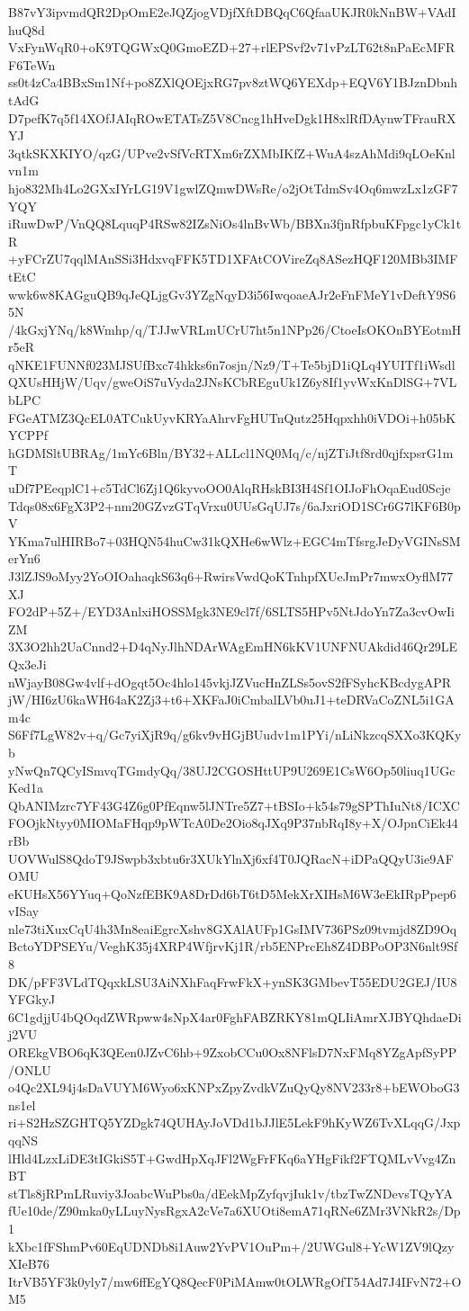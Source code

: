B87vY3ipvmdQR2DpOmE2eJQZjogVDjfXftDBQqC6QfaaUKJR0kNnBW+VAdIhuQ8d
VxFynWqR0+oK9TQGWxQ0GmoEZD+27+rlEPSvf2v71vPzLT62t8nPaEcMFRF6TeWn
ss0t4zCa4BBxSm1Nf+po8ZXlQOEjxRG7pv8ztWQ6YEXdp+EQV6Y1BJznDbnhtAdG
D7pefK7q5f14XOfJAIqROwETATsZ5V8Cncg1hHveDgk1H8xlRfDAynwTFrauRXYJ
3qtkSKXKIYO/qzG/UPve2vSfVcRTXm6rZXMbIKfZ+WuA4szAhMdi9qLOeKnlvn1m
hjo832Mh4Lo2GXxIYrLG19V1gwlZQmwDWsRe/o2jOtTdmSv4Oq6mwzLx1zGF7YQY
iRuwDwP/VnQQ8LquqP4RSw82IZsNiOs4lnBvWb/BBXn3fjnRfpbuKFpgc1yCk1tR
+yFCrZU7qqlMAnSSi3HdxvqFFK5TD1XFAtCOVireZq8ASezHQF120MBb3IMFtEtC
wwk6w8KAGguQB9qJeQLjgGv3YZgNqyD3i56IwqoaeAJr2eFnFMeY1vDeftY9S65N
/4kGxjYNq/k8Wmhp/q/TJJwVRLmUCrU7ht5n1NPp26/CtoeIsOKOnBYEotmHr5eR
qNKE1FUNNf023MJSUfBxc74hkks6n7osjn/Nz9/T+Te5bjD1iQLq4YUITf1iWsdl
QXUsHHjW/Uqv/gweOiS7uVyda2JNsKCbREguUk1Z6y8If1yvWxKnDlSG+7VLbLPC
FGeATMZ3QcEL0ATCukUyvKRYaAhrvFgHUTnQutz25Hqpxhh0iVDOi+h05bKYCPPf
hGDMSltUBRAg/1mYc6Bln/BY32+ALLcl1NQ0Mq/c/njZTiJtf8rd0qjfxpsrG1mT
uDf7PEeqplC1+c5TdCl6Zj1Q6kyvoOO0AlqRHskBI3H4Sf1OIJoFhOqaEud0Scje
Tdqs08x6FgX3P2+nm20GZvzGTqVrxu0UUsGqUJ7s/6aJxriOD1SCr6G7lKF6B0pV
YKma7ulHIRBo7+03HQN54huCw31kQXHe6wWlz+EGC4mTfsrgJeDyVGINsSMerYn6
J3lZJS9oMyy2YoOIOahaqkS63q6+RwirsVwdQoKTnhpfXUeJmPr7mwxOyflM77XJ
FO2dP+5Z+/EYD3AnlxiHOSSMgk3NE9cl7f/6SLTS5HPv5NtJdoYn7Za3cvOwIiZM
3X3O2hh2UaCnnd2+D4qNyJlhNDArWAgEmHN6kKV1UNFNUAkdid46Qr29LEQx3eJi
nWjayB08Gw4vlf+dOgqt5Oc4hlo145vkjJZVucHnZLSs5ovS2fFSyhcKBcdygAPR
jW/HI6zU6kaWH64aK2Zj3+t6+XKFaJ0iCmbalLVb0uJ1+teDRVaCoZNL5i1GAm4c
S6Ff7LgW82v+q/Gc7yiXjR9q/g6kv9vHGjBUudv1m1PYi/nLiNkzcqSXXo3KQKyb
yNwQn7QCyISmvqTGmdyQq/38UJ2CGOSHttUP9U269E1CsW6Op50liuq1UGcKed1a
QbANIMzrc7YF43G4Z6g0PfEqnw5lJNTre5Z7+tBSIo+k54s79gSPThIuNt8/ICXC
FOOjkNtyy0MIOMaFHqp9pWTcA0De2Oio8qJXq9P37nbRqI8y+X/OJpnCiEk44rBb
UOVWulS8QdoT9JSwpb3xbtu6r3XUkYlnXj6xf4T0JQRacN+iDPaQQyU3ie9AFOMU
eKUHsX56YYuq+QoNzfEBK9A8DrDd6bT6tD5MekXrXIHsM6W3eEkIRpPpep6vISay
nle73tiXuxCqU4h3Mn8eaiEgrcXshv8GXAlAUFp1GsIMV736PSz09tvmjd8ZD9Oq
BctoYDPSEYu/VeghK35j4XRP4WfjrvKj1R/rb5ENPrcEh8Z4DBPoOP3N6nlt9Sf8
DK/pFF3VLdTQqxkLSU3AiNXhFaqFrwFkX+ynSK3GMbevT55EDU2GEJ/IU8YFGkyJ
6C1gdjjU4bQOqdZWRpww4sNpX4ar0FghFABZRKY81mQLIiAmrXJBYQhdaeDij2VU
OREkgVBO6qK3QEen0JZvC6hb+9ZxobCCu0Ox8NFlsD7NxFMq8YZgApfSyPP/ONLU
o4Qc2XL94j4sDaVUYM6Wyo6xKNPxZpyZvdkVZuQyQy8NV233r8+bEWOboG3ns1el
ri+S2HzSZGHTQ5YZDgk74QUHAyJoVDd1bJJlE5LekF9hKyWZ6TvXLqqG/JxpqqNS
lHld4LzxLiDE3tIGkiS5T+GwdHpXqJFl2WgFrFKq6aYHgFikf2FTQMLvVvg4ZnBT
stTls8jRPmLRuviy3JoabcWuPbs0a/dEekMpZyfqvjIuk1v/tbzTwZNDevsTQyYA
fUe10de/Z90mka0yLLuyNysRgxA2cVe7a6XUOti8emA71qRNe6ZMr3VNkR2s/Dp1
kXbc1fFShmPv60EqUDNDb8i1Auw2YvPV1OuPm+/2UWGul8+YcW1ZV9lQzyXIeB76
ItrVB5YF3k0yly7/mw6ffEgYQ8QecF0PiMAmw0tOLWRgOfT54Ad7J4IFvN72+OM5
